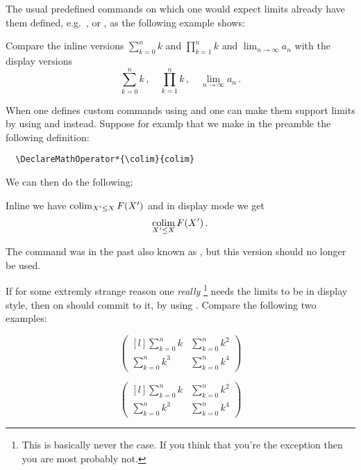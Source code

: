 \documentclass[a4paper, 10pt, abstract=on, headings=standardclasses]{scrartcl}
\begin{document}
The usual predefined commands on which one would expect limits already have them defined, e.g.\ ,  or , as the following example shows:
\begin{LTXexample}[pos = r]
  Compare the inline versions $\sum_{k=0}^n k$ and $\prod_{k=1}^n k$ and $\lim_{n \to \infty} a_n$ with the display versions
  \[
    \sum_{k=0}^n k \,,
    \quad
    \prod_{k=1}^n k \,,
    \quad
    \lim_{n \to \infty} a_n \,.
  \]
\end{LTXexample}
When one defines custom commands using  and  one can make them support limits by using  and  instead.
Suppose for examlp that we make in the preamble the following definition:
\begin{lstlisting}
  \DeclareMathOperator*{\colim}{colim}
\end{lstlisting}
We can then do the following:
\begin{LTXexample}[pos = b]
  Inline we have $\colim_{X' \leq X} F(X')$ and in display mode we get
  \[
    \colim_{X' \leq X} F(X') \,.
  \]
\end{LTXexample}
The command  was in the past also known as , but this version should no longer be used.

If for some extremly strange reason one \textit{really}%
\footnote{This is basically never the case.
If you think that you’re the exception then you are most probably not.}
needs the limits to be in display style, then on should commit to it, by using .
Compare the following two examples:
\begin{LTXexample}[pos = r]
  \[
    \begin{pmatrix*}[l]
        \sum_{k=0}^n k
      & \sum_{k=0}^n k^2
      \\
        \sum_{k=0}^n k^3
      & \sum_{k=0}^n k^4
    \end{pmatrix*}
  \]
\end{LTXexample}
\begin{LTXexample}[pos = r]
  \[
    \begin{pmatrix*}[l]
        \displaystyle \sum_{k=0}^n k
      & \displaystyle \sum_{k=0}^n k^2
      \\
        \displaystyle \sum_{k=0}^n k^3
      & \displaystyle \sum_{k=0}^n k^4
    \end{pmatrix*}
  \]
\end{LTXexample}
\end{document}
